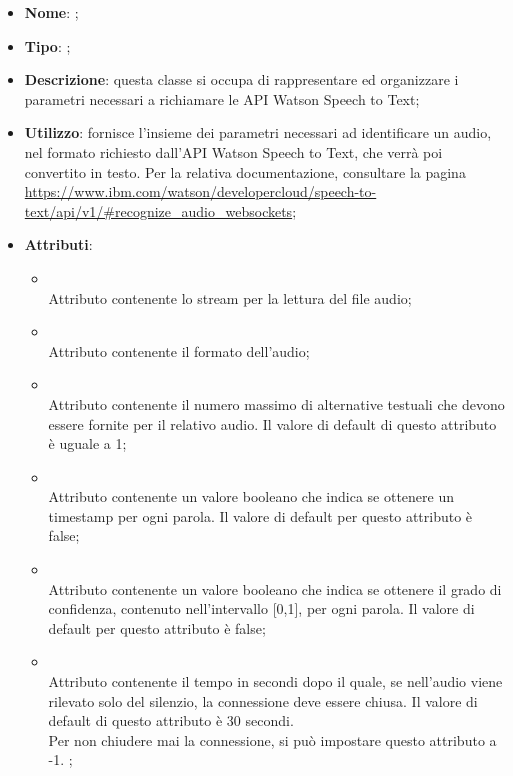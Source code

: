 \begin{itemize}
	\item \textbf{Nome}: ;
	\item \textbf{Tipo}: ;
	\item \textbf{Descrizione}: questa classe si occupa di rappresentare ed organizzare i parametri necessari a richiamare le API Watson Speech to Text;
	\item \textbf{Utilizzo}: fornisce l'insieme dei parametri necessari ad identificare un audio, nel formato richiesto dall'API Watson Speech to Text, che verrà poi convertito in testo.
Per la relativa documentazione, consultare la pagina \url{https://www.ibm.com/watson/developercloud/speech-to-text/api/v1/#recognize_audio_websockets};
	\item \textbf{Attributi}:
	\begin{itemize}
		\item[]  \\
		Attributo contenente lo stream per la lettura del file audio;
		\item[]  \\
		Attributo contenente il formato dell'audio;
		\item[]  \\
		Attributo contenente il numero massimo di alternative testuali che devono essere fornite per il relativo audio. Il valore di default di questo attributo è uguale a 1;
		\item[]  \\
		Attributo contenente un valore booleano che indica se ottenere un timestamp per ogni parola. Il valore di default per questo attributo è false;
		\item[]  \\
		Attributo contenente un valore booleano che indica se ottenere il grado di confidenza, contenuto nell'intervallo [0,1], per ogni parola. Il valore di default per questo attributo è false;
		\item[]  \\
		Attributo contenente il tempo in secondi dopo il quale, se nell'audio viene rilevato solo del silenzio, la connessione deve essere chiusa. Il valore di default di questo attributo è 30 secondi. \\
Per non chiudere mai la connessione, si può impostare questo attributo a -1. ;

\end{itemize}
\end{itemize}
